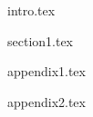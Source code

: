\documentclass{spbseu}
\begin{document}

\maketitle

\newpage

\tableofcontents

\newpage

{intro.tex}

\newpage

{section1.tex}

\newpage

\nocite{*}
\printbibliography

\newpage

{appendix1.tex}

\newpage

{appendix2.tex}
\end{document}
